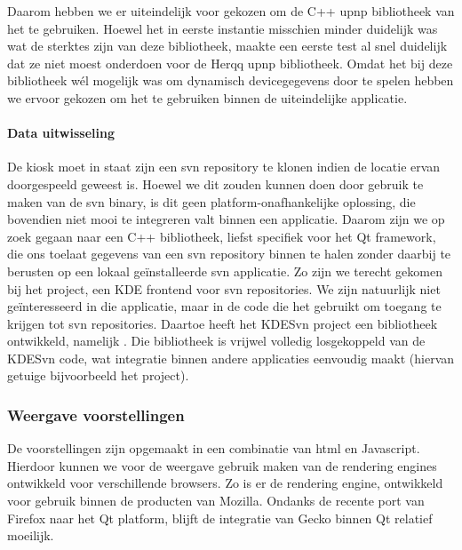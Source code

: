 Daarom hebben we er uiteindelijk voor gekozen om de C++ \ac{upnp} bibliotheek van het  te gebruiken. Hoewel het in eerste instantie misschien minder duidelijk was wat de sterktes zijn van deze bibliotheek, maakte een eerste test al snel duidelijk dat ze niet moest onderdoen voor de Herqq \ac{upnp} bibliotheek. Omdat het bij deze bibliotheek wél mogelijk was om dynamisch devicegegevens door te spelen hebben we ervoor gekozen om het te gebruiken binnen de uiteindelijke applicatie.

\paragraph{Data uitwisseling} De kiosk moet in staat zijn een \ac{svn} repository te klonen indien de locatie ervan doorgespeeld geweest is. Hoewel we dit zouden kunnen doen door gebruik te maken van de \ac{svn} binary, is dit geen platform-onafhankelijke oplossing, die bovendien niet mooi te integreren valt binnen een applicatie. Daarom zijn we op zoek gegaan naar een C++ bibliotheek, liefst specifiek voor het Qt framework, die ons toelaat gegevens van een \ac{svn} repository binnen te halen zonder daarbij te berusten op een lokaal geïnstalleerde \ac{svn} applicatie. Zo zijn we terecht gekomen bij het  project, een KDE frontend voor \ac{svn} repositories. We zijn natuurlijk niet geïnteresseerd in die applicatie, maar in de code die het gebruikt om toegang te krijgen tot \ac{svn} repositories. Daartoe heeft het KDESvn project een bibliotheek ontwikkeld, namelijk . Die bibliotheek is vrijwel volledig losgekoppeld van de KDESvn code, wat integratie binnen andere applicaties eenvoudig maakt (hiervan getuige bijvoorbeeld het  project).

\subsubsection{Weergave voorstellingen}

De voorstellingen zijn opgemaakt in een combinatie van \ac{html} en Javascript. Hierdoor kunnen we voor de weergave gebruik maken van de rendering engines ontwikkeld voor verschillende browsers. Zo is er de  rendering engine, ontwikkeld voor gebruik binnen de producten van Mozilla. Ondanks de recente port van Firefox naar het Qt platform, blijft de integratie van Gecko binnen Qt relatief moeilijk.

